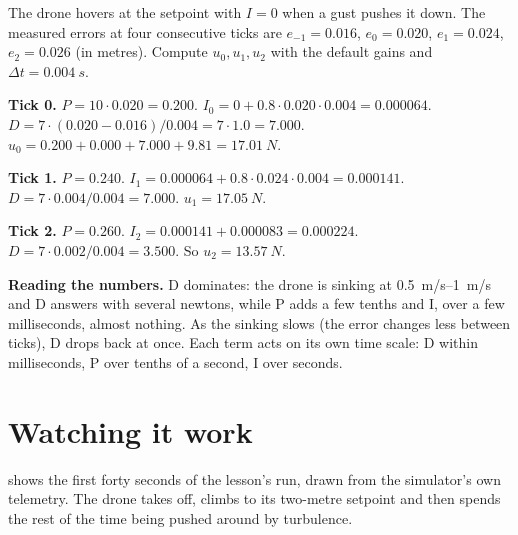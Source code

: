\begin{example}
\label{ex:meet-ticks}
The drone hovers at the setpoint with $I = 0$ when a gust pushes it down. The measured errors at four consecutive ticks are $e_{-1} = 0.016$, $e_0 = 0.020$, $e_1 = 0.024$, $e_2 = 0.026$ (in metres). Compute $u_0, u_1, u_2$ with the default gains and $\Delta t = \SI{0.004}{s}$.

\textbf{Tick 0.} $P = 10 \cdot 0.020 = 0.200$. $I_0 = 0 + 0.8 \cdot 0.020 \cdot 0.004 = 0.000064$. $D = 7 \cdot (0.020 - 0.016)/0.004 = 7 \cdot 1.0 = 7.000$. $u_0 = 0.200 + 0.000 + 7.000 + 9.81 = \SI{17.01}{N}$.

\textbf{Tick 1.} $P = 0.240$. $I_1 = 0.000064 + 0.8\cdot0.024\cdot0.004 = 0.000141$. $D = 7 \cdot 0.004/0.004 = 7.000$. $u_1 = \SI{17.05}{N}$.

\textbf{Tick 2.} $P = 0.260$. $I_2 = 0.000141 + 0.000083 = 0.000224$. $D = 7 \cdot 0.002/0.004 = 3.500$. So $u_2 = \SI{13.57}{N}$.

\textbf{Reading the numbers.} D dominates: the drone is sinking at \SIrange{0.5}{1}{m/s} and D answers with several newtons, while P adds a few tenths and I, over a few milliseconds, almost nothing. As the sinking slows (the error changes less between ticks), D drops back at once. Each term acts on its own time scale: D within milliseconds, P over tenths of a second, I over seconds.
\end{example}

\section{Watching it work}

 shows the first forty seconds of the lesson's run, drawn from the simulator's own telemetry. The drone takes off, climbs to its two-metre setpoint and then spends the rest of the time being pushed around by turbulence.



